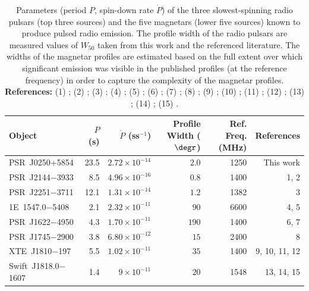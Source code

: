 \begin{table}
	\centering
	\caption[Properties of the slow rotation-powered pulsars and radio magnetars]{Parameters (period $P$, spin-down rate $\dot{P}$) of the three slowest-spinning radio pulsars (top three sources) and the five magnetars (lower five sources) known to produce pulsed radio emission. The profile width of the radio pulsars are measured values of $W_{50}$ taken from this work and the referenced literature. The widths of the magnetar profiles are estimated based on the full extent over which significant emission was visible in the published profiles (at the reference frequency) in order to capture the complexity of the magnetar profiles. \newline \textbf{References:} (1) \citet{YMJx1999}; (2) \citet{MBMA2020}; (3) \citet{MKE+2020}; (4) \citet{CRHR2007a}; (5) \citet{CRJ+2008}; (6) \citet{LBB+2010}; (7) \citet{LBB+2012}; (8) \citet{EFK+2013}; (9) \citet{CRH+2006}; (10) \citet{CRJ+2007b}; (11) \citet{KSJ+2007}; (12) \citet{LLD+2019}; (13) \citet{ERB+2020}; (14) \citet{LSJB2020}; (15) \citet{CCC+2020}.}
	\label{tab: J0250 - magnetar comparison}
	\begin{tabular}{lrrrrr} %
		\hline
	    Object & $P$ (s) & $\dot{P}$ (ss$^{-1}$) & Profile Width ($\degr$) & Ref. Freq. (MHz) & References\\
		\hline
		PSR~J0250+5854          & 23.5 & $2.72\times10^{-14}$ &  $2.0$ & 1250 & This work\\
		PSR~J2144$-$3933        & 8.5  & $4.96\times10^{-16}$ &  $0.8$ & 1400 & 1, 2\\
		PSR~J2251$-$3711        & 12.1 & $1.31\times10^{-14}$ & $1.2$  & 1382 & 3\\
		\hline
		1E~1547.0$-$5408        & 2.1  & $2.32\times10^{-11}$ & $90$   & 6600 & 4, 5\\
        PSR~J1622$-$4950        & 4.3  & $1.70\times10^{-11}$ & $190$  & 1400 & 6, 7\\
        PSR~J1745$-$2900        & 3.8  & $6.80\times10^{-12}$ & $15$   & 2400 & 8\\
        XTE~J1810$-$197          & 5.5  & $1.02\times10^{-11}$ & $35$   & 1400 & 9, 10, 11, 12\\
        Swift~J1818.0$-$1607    & 1.4  & $9\times10^{-11}$    & $20$   & 1548 & 13, 14, 15\\
		\hline
	\end{tabular}
\end{table}

